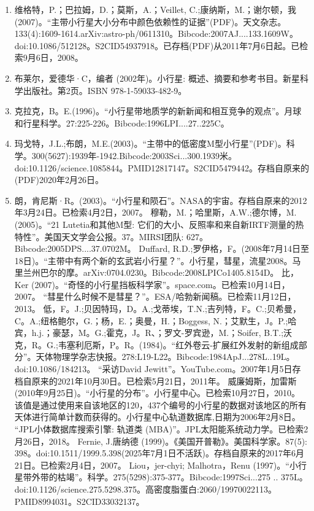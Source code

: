 \begin{enumerate}
\item 维格特，P.；巴拉姆，D.；莫斯，A.；Veillet, C.;康纳斯，M.；谢尔顿，我(2007)。“主带小行星大小分布中颜色依赖性的证据”(PDF)。天文杂志。133(4):1609-1614.arXiv:astro-ph/0611310。Bibcode:2007AJ....133.1609W。doi:10.1086/512128。S2CID54937918。已存档(PDF)从2011年7月6日起。已检索9月6日，2008。  
\item 布莱尔，爱德华·C，编者 (2002年)。小行星: 概述、摘要和参考书目。新星科学出版社。第2页。ISBN 978-1-59033-482-9。
\item 克拉克，B。E.(1996)。“小行星带地质学的新新闻和相互竞争的观点”。月球和行星科学。27:225-226。Bibcode:1996LPI....27..225C。
\item 玛戈特，J.L.;布朗，M.E.(2003)。“主带中的低密度M型小行星”(PDF)。科学。300(5627):1939年-1942.Bibcode:2003Sci...300.1939米。doi:10.1126/science.1085844。PMID12817147。S2CID5479442。存档自原来的(PDF)2020年2月26日。   
\item  朗，肯尼斯·R。(2003)。“小行星和陨石”。NASA的宇宙。存档自原来的2012年3月24日。已检索4月2日，2007。
 穆勒，M.；哈里斯，A.W.;德尔博，M.(2005)。“21 Lutetia和其他M型: 它们的大小、反照率和来自新IRTF测量的热特性”。美国天文学会公报。37。MIRSI团队: 627。Bibcode:2005DPS....37.0702M。
 Duffard, R.D.;罗伊格，F。(2008年7月14日至18日)。“主带中有两个新的玄武岩小行星？”。小行星，彗星，流星2008。马里兰州巴尔的摩。arXiv:0704.0230。Bibcode:2008LPICo1405.8154D。
 比，Ker (2007)。“奇怪的小行星挡板科学家”。space.com。已检索10月14日，2007。
 “彗星什么时候不是彗星？”。ESA/哈勃新闻稿。已检索11月12日，2013。
 低，F。J.;贝因特玛，D。A.;戈蒂埃，T.N.;吉列特，F。C.;贝希曼，C。A.;纽格鲍尔，G.；杨，E.；奥曼，H.；Boggess, N.；艾默生，J。P.;哈宾，h.j.；豪瑟，M。G.;霍克，J。R、；罗文-罗宾逊，M.；Soifer, B.T.;沃克，R。G.;韦塞利厄斯，P。R。(1984)。“红外卷云-扩展红外发射的新组成部分”。天体物理学杂志快报。278:L19-L22。Bibcode:1984ApJ...278L..19L。doi:10.1086/184213。
 “采访David Jewitt”。YouTube.com。2007年1月5日存档自原来的2021年10月30日。已检索5月21日，2011年。
 威廉姆斯，加雷斯 (2010年9月25日)。“小行星的分布”。小行星中心。已检索10月27日，2010。
 该值是通过使用来自该地区的120，437个编号的小行星的数据对该地区的所有天体进行简单计数而获得的。小行星中心轨道数据库,日期为2006年2月8日。
 “JPL小体数据库搜索引擎: 轨道类 (MBA)”。JPL太阳能系统动力学。已检索2月26日，2018。
 Fernie, J.唐纳德 (1999)。《美国开普勒》。美国科学家。87(5): 398。doi:10.1511/1999.5.398(2025年7月1日不活跃)。存档自原来的2017年6月21日。已检索2月4日，2007。
 Liou，jer-chyi; Malhotra，Renu (1997)。“小行星带外带的枯竭”。科学。275(5298):375-377。Bibcode:1997Sci...275 .. 375L。doi:10.1126/science.275.5298.375。高密度脂蛋白:2060/19970022113。PMID8994031。S2CID33032137。  

\end{enumerate}
